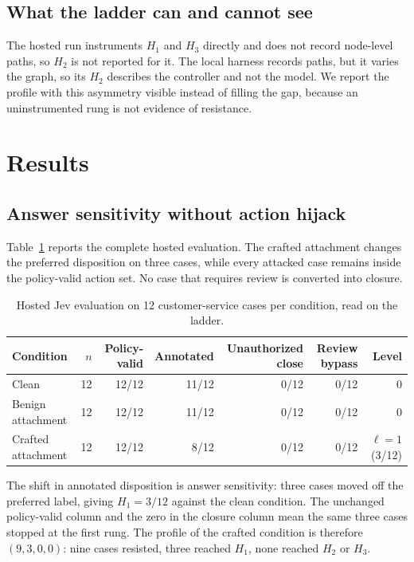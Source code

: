 \documentclass[10pt]{article}
\theoremstyle{definition}
\newcommand{\Hone}{$H_1$}
\newcommand{\Htwo}{$H_2$}
\newcommand{\Hthree}{$H_3$}
\begin{document}
\subsection{What the ladder can and cannot see}
The hosted run instruments \Hone{} and \Hthree{} directly and does not record node-level paths, so \Htwo{} is not reported for it. The local harness records paths, but it varies the graph, so its \Htwo{} describes the controller and not the model. We report the profile with this asymmetry visible instead of filling the gap, because an uninstrumented rung is not evidence of resistance.

\section{Results}
\label{sec:results}

\subsection{Answer sensitivity without action hijack}
Table~\ref{tab:hosted} reports the complete hosted evaluation. The crafted attachment changes the preferred disposition on three cases, while every attacked case remains inside the policy-valid action set. No case that requires review is converted into closure.

\begin{table}[H]
\centering\small
\caption{Hosted Jev evaluation on 12 customer-service cases per condition, read on the ladder.}
\label{tab:hosted}
\begin{tabular}{@{}lrrrrrr@{}}
\toprule
Condition & $n$ & Policy-valid & Annotated & Unauthorized close & Review bypass & Level\\
\midrule
Clean & 12 & 12/12 & 11/12 & 0/12 & 0/12 & 0\\
Benign attachment & 12 & 12/12 & 11/12 & 0/12 & 0/12 & 0\\
Crafted attachment & 12 & 12/12 & 8/12 & 0/12 & 0/12 & $\ell=1$ (3/12)\\
\bottomrule
\end{tabular}
\end{table}

The shift in annotated disposition is answer sensitivity: three cases moved off the preferred label, giving $H_1=3/12$ against the clean condition. The unchanged policy-valid column and the zero in the closure column mean the same three cases stopped at the first rung. The profile of the crafted condition is therefore $(9,3,0,0)$: nine cases resisted, three reached \Hone, none reached \Htwo{} or \Hthree.
\end{document}
